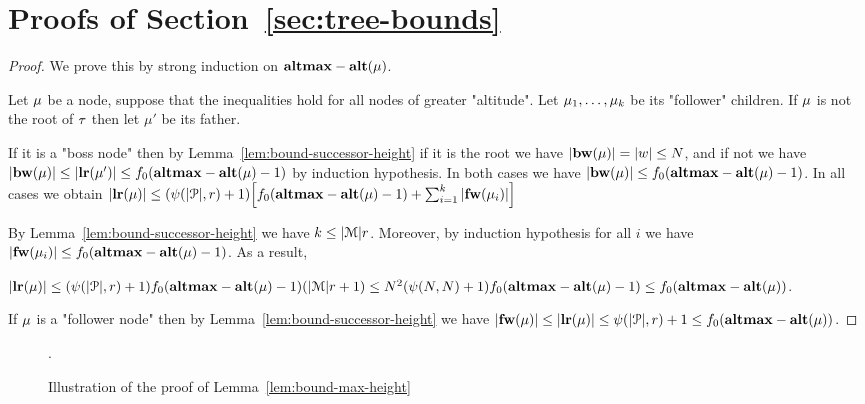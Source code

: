 \section{Proofs of Section~\ref{sec:tree-bounds}}

\lemBoundLengthHeightH*

\begin{proof}
	We prove this by strong induction on $\mathbf{altmax}-\mathbf{alt}(\mu)$.
	
	Let $\mu$ be a node, suppose that the inequalities hold for all nodes of greater "altitude". 
	Let $\mu_1, \ldots, \mu_k$ be its "follower" children. If $\mu$ is not the root of $\tau$ then let $\mu'$ be its father.
	
	If it is a "boss node" then by Lemma~\ref{lem:bound-successor-height} if it is the root we have $|\mathbf{bw}(\mu)| = |w| \leq N$, and if not we have $|\mathbf{bw}(\mu)| \leq |\mathbf{lr}(\mu')| \leq f_0(\mathbf{altmax} - \mathbf{alt}(\mu) -1)$ by induction hypothesis. In both cases we have $|\mathbf{bw}(\mu)| \leq f_0(\mathbf{altmax} - \mathbf{alt}(\mu) -1)$.	
	In all cases we obtain $|\mathbf{lr}(\mu)| \leq (\psi(|\mathcal{P}|,r)+1) \Big[f_0(\mathbf{altmax}-\mathbf{alt}(\mu) -1) + \sum_{i=1}^k |\mathbf{fw}(\mu_i)|\Big]$
	
	By Lemma~\ref{lem:bound-successor-height} we have $k \leq |\mathcal{M}|r$.
	Moreover, by induction hypothesis for all $i$ we have 
	$|\mathbf{fw}(\mu_i)| \leq f_0(\mathbf{altmax}-\mathbf{alt}(\mu) -1)$. As a result,
	
	$|\mathbf{lr}(\mu)| \leq (\psi(|\mathcal{P}|,r)+1) f_0(\mathbf{altmax}-\mathbf{alt}(\mu) -1)(|\mathcal{M}| r +1) \leq N^2(\psi(N,N) +1) f_0(\mathbf{altmax} - \mathbf{alt}(\mu) -1) \leq f_0(\mathbf{altmax} - \mathbf{alt}(\mu))$.
	
	If $\mu$ is a "follower node" then by Lemma~\ref{lem:bound-successor-height} we have 
	$|\mathbf{fw}(\mu)| \leq |\mathbf{lr}(\mu)| \leq \psi(|\mathcal{P}|,r) +1 \leq f_0(\mathbf{altmax} - \mathbf{alt}(\mu))$.
\end{proof}

\begin{figure}
	
	\caption{Illustration of the proof of Lemma~\ref{lem:bound-max-height}}.
	\label{fig:max-height-bound}
\end{figure}

\lemBoundMaxHeight*

